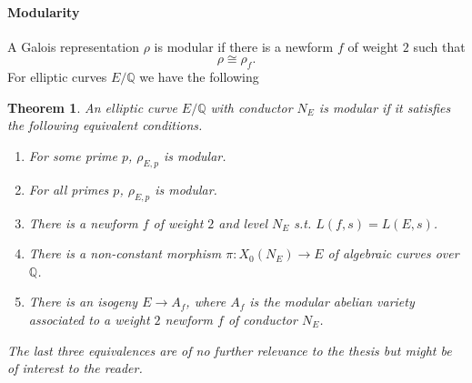 \documentclass{article}
\theoremstyle{plain}%
\newtheorem{theorem}{Theorem}[section]
\theoremstyle{definition}
\theoremstyle{remark}
\begin{document}
\paragraph{Modularity}
A Galois representation \(\rho\) is modular if there is a newform \(f\) of weight \(2\) such that
\[
    \rho \cong \rho_f. 
\]
For elliptic curves \(E/\mathbb{Q}\) we have the following
\begin{theorem}\cite[chapter 1, theorem 5.1]{Cornell1997}\label{th:eqcondmodularity}
    An elliptic curve \(E/\mathbb{Q}\) with conductor \(N_E\) is modular if it satisfies the following equivalent conditions.
    \begin{enumerate}
        \item For some prime \(p\), \(\rho_{E,p}\) is modular.
        \item For all primes \(p\), \(\rho_{E,p}\) is modular.
        \item There is a newform \(f\) of weight \(2\) and level \(N_E\) s.t. \(L(f, s) = L(E, s)\).
        \item There is a non-constant morphism \(\pi\colon X_0(N_E) \to E\) of algebraic curves over \(\mathbb{Q}\).
        \item There is an isogeny \(E \to A_f\), where \(A_f\) is the modular abelian variety associated to a
        weight \(2\) newform \(f\) of conductor \(N_E\).
    \end{enumerate}
    The last three equivalences are of no further relevance to the thesis but might be of interest to the reader.
\end{theorem}
\end{document}
